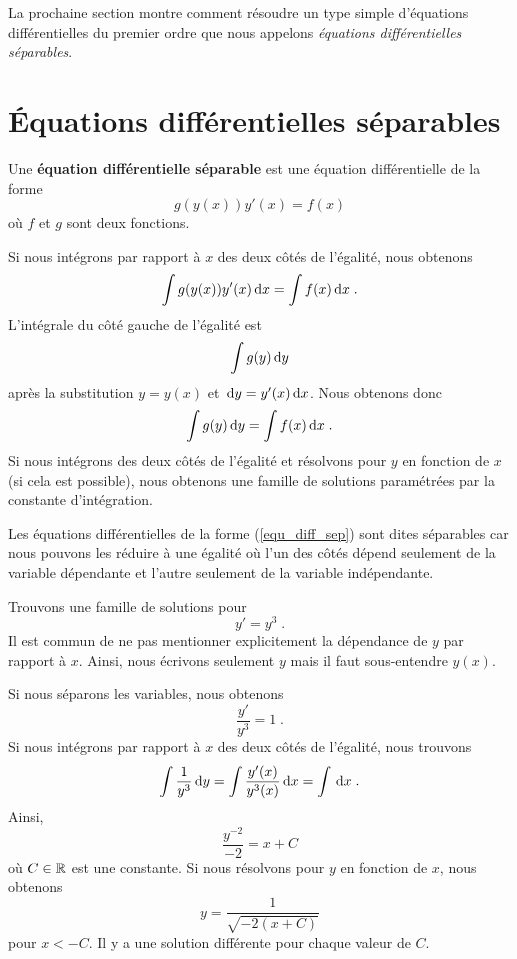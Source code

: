 {La prochaine section montre comment résoudre un type simple
d'équations différentielles du premier ordre que nous appelons
{\em équations différentielles séparables}.

\section{Équations différentielles séparables}

\begin{defn} 
Une {\bfseries équation différentielle séparable} est une équation
différentielle de la forme
\begin{equation}\label{equ_diff_sep}
g(y(x)) y'(x) = f(x)
\end{equation}
où $f$ et $g$ sont deux fonctions.
\end{defn}

Si nous intégrons par rapport à $x$ des deux côtés de l'égalité, nous
obtenons
\[
\int g(y(x)) y'(x) \,\mathrm{d}x = \int f(x) \,\mathrm{d}x \; .
\]
L'intégrale du côté gauche de l'égalité est
\[
\int g(y) \,\mathrm{d}y
\]
après la substitution $y = y(x)$ et $\,\mathrm{d}y = y'(x) \,\mathrm{d}x$.  Nous
obtenons donc
\[
\int g(y) \,\mathrm{d}y = \int f(x) \,\mathrm{d}x \; .
\]
Si nous intégrons des deux côtés de l'égalité et résolvons pour $y$ en
fonction de $x$ (si cela est possible), nous obtenons une famille de
solutions paramétrées par la constante d'intégration.

Les équations différentielles de la forme (\ref{equ_diff_sep}) sont
dites séparables car nous pouvons les réduire à une égalité où l'un des
côtés dépend seulement de la variable dépendante et l'autre seulement
de la variable indépendante.

\begin{egg}
Trouvons une famille de solutions pour
\[
y' = y^3 \; .
\]
Il est commun de ne pas mentionner explicitement la dépendance de $y$
par rapport à $x$.  Ainsi, nous écrivons seulement $y$ mais il faut
sous-entendre $y(x)$.

Si nous séparons les variables, nous obtenons
\[
\frac{y'}{y^3} = 1 \; .
\]
Si nous intégrons par rapport à $x$ des deux côtés de l'égalité, nous trouvons
\[
\int \frac{1}{y^3} \,\mathrm{d}y = \int \frac{y'(x)}{y^3(x)} \,\mathrm{d}x = \int \,\mathrm{d}x \; .
\]
Ainsi,
\[
\frac{y^{-2}}{-2} = x + C
\]
où $C \in \mathbb{R}$ est une constante.  Si nous résolvons pour $y$ en fonction
de $x$, nous obtenons
\[
y = \frac{1}{\sqrt{-2(x+C)}}
\]
pour $x < -C$.  Il y a une solution différente pour chaque valeur de $C$.
\end{egg}

}
